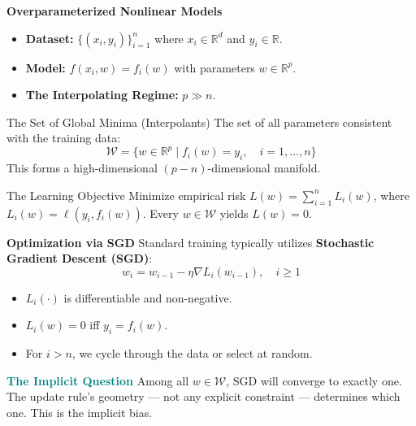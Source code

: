 \documentclass[aspectratio=169]{beamer}
\begin{document}
\begin{frame}{\textcolor{cmindsblue}{\textbf{Overparameterized Nonlinear Models}}}
    \begin{itemize}
        \item \textbf{Dataset:} $\{(x_i, y_i)\}_{i=1}^n$ where $x_i \in \mathbb{R}^d$ and $y_i \in \mathbb{R}$.
        \item \textbf{Model:} $f(x_i, w) = f_i(w)$ with parameters $w \in \mathbb{R}^p$.
        \item \textbf{The Interpolating Regime:} $p \gg n$.
    \end{itemize}

    \begin{block}{The Set of Global Minima (Interpolants)}
        The set of all parameters consistent with the training data:
        \begin{equation}
            \mathcal{W} = \{w \in \mathbb{R}^p \mid f_i(w) = y_i, \quad i=1, \dots, n\}
        \end{equation}
        This forms a high-dimensional $(p-n)$-dimensional manifold.
    \end{block}

    \begin{block}{The Learning Objective}
        Minimize empirical risk $L(w) = \sum_{i=1}^n L_i(w)$, where $L_i(w) = \ell(y_i, f_i(w))$. Every $w \in \mathcal{W}$ yields $L(w) = 0$.
    \end{block}
\end{frame}

\begin{frame}{\textcolor{cmindsblue}{\textbf{Optimization via SGD}}}
    Standard training typically utilizes \textbf{Stochastic Gradient Descent (SGD)}:
    \begin{equation}
        w_i = w_{i-1} - \eta \nabla L_i(w_{i-1}), \quad i \geq 1
    \end{equation}
    
    \vspace{0.3cm}
    \begin{itemize}
        \item $L_i(\cdot)$ is differentiable and non-negative.
        \item $L_i(w) = 0$ iff $y_i = f_i(w)$.
        \item For $i > n$, we cycle through the data or select at random.
    \end{itemize}
    \vfill
    \begin{block}{\textbf{\textcolor{teal}{The Implicit Question}}}
    Among all $w \in \mathcal{W}$, SGD will converge to exactly one. The update rule's geometry — not any explicit constraint — determines which one. This is the implicit bias.
    \end{block}
\end{frame}
\end{document}
